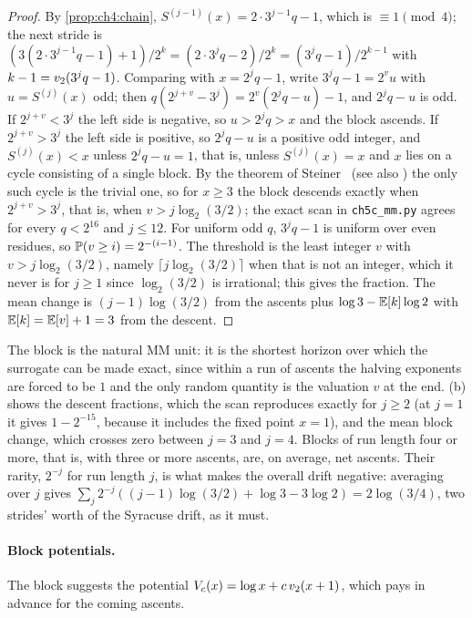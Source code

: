 \begin{proof}
By \cref{prop:ch4:chain}, $S^{(j-1)}(x)=2\cdot3^{j-1}q-1$, which is $\equiv1
\pmod4$; the next stride is $(3(2\cdot3^{j-1}q-1)+1)/2^k=(2\cdot3^jq-2)/2^k=
(3^jq-1)/2^{k-1}$ with $k-1=v_2(3^jq-1)$.
Comparing with $x=2^jq-1$, write $3^jq-1=2^vu$ with $u=S^{(j)}(x)$ odd; then $q(2^{j+v}-3^j)=2^v(2^jq-u)-1$, and $2^jq-u$ is odd.
If $2^{j+v}<3^j$ the left side is negative, so $u>2^jq>x$ and the block ascends.
If $2^{j+v}>3^j$ the left side is positive, so $2^jq-u$ is a positive odd integer, and $S^{(j)}(x)<x$ unless $2^jq-u=1$, that is, unless $S^{(j)}(x)=x$ and $x$ lies on a cycle consisting of a single block.
By the theorem of Steiner~\cite{steiner1977} (see also \cite[Theorem~J]{lagarias1985}) the only such cycle is the trivial one, so for $x\ge3$ the block descends exactly when $2^{j+v}>3^j$, that is, when $v>j\log_2(3/2)$; the exact scan in \texttt{ch5c\_mm.py} agrees for every $q<2^{16}$ and $j\le12$.
For uniform odd $q$, $3^jq-1$ is uniform over
even residues, so $\mathbb{P}(v\ge i)=2^{-(i-1)}$. The threshold is the least
integer $v$ with $v>j\log_2(3/2)$, namely $\lceil j\log_2(3/2)\rceil$ when that
is not an integer, which it never is for $j\ge1$ since $\log_2(3/2)$ is
irrational; this gives the fraction. The mean change is $(j-1)\log(3/2)$ from
the ascents plus $\log3-\mathbb{E}[k]\log2$ with $\mathbb{E}[k]=\mathbb{E}[v]+1=3$ from the descent.
\end{proof}

The block is the natural MM unit: it is the shortest horizon over which the
surrogate can be made exact, since within a run of ascents the halving exponents
are forced to be $1$ and the only random quantity is the valuation $v$ at the
end. (b) shows the descent fractions, which the scan
reproduces exactly for $j\ge2$ (at $j=1$ it gives $1-2^{-15}$, because it includes the fixed point $x=1$), and the mean block change, which crosses zero between
$j=3$ and $j=4$. Blocks of run length four or more, that is, with three or more ascents, are, on average, net ascents.
Their rarity, $2^{-j}$ for run length $j$, is what makes the overall drift
negative: averaging over $j$ gives $\sum_j2^{-j}((j-1)\log(3/2)+\log3-3\log2)
=2\log(3/4)$, two strides' worth of the Syracuse drift, as it must.

\paragraph{Block potentials.} The block suggests the potential
$V_c(x)=\log x+c\,v_2(x+1)$, which pays in advance for the coming ascents.

